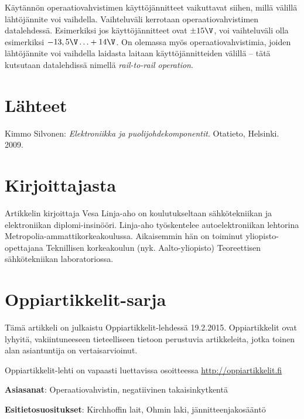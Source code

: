 \documentclass[twocolumn]{article}
\begin{document}
Käytännön operaatiovahvistimen käyttöjännitteet vaikuttavat siihen, millä välillä lähtöjännite voi vaihdella. Vaihteluväli kerrotaan operaatiovahvistimen datalehdessä. Esimerkiksi jos käyttöjännitteet ovat $\pm 15 \V$, voi vaihteluväli olla esimerkiksi  $-13,5\V \ldots +14 \V$. On olemassa myös operaatiovahvistimia, joiden lähtöjännite voi vaihdella laidasta laitaan käyttöjännitteiden välillä – tätä kutsutaan datalehdissä nimellä {\em rail-to-rail operation}.


\section{Lähteet}

Kimmo Silvonen: {\em Elektroniikka ja puolijohdekomponentit}. Otatieto, Helsinki. 2009.




\section*{Kirjoittajasta}

Artikkelin kirjoittaja Vesa Linja-aho on koulutukseltaan sähkötekniikan ja elektroniikan diplomi-insinööri. Linja-aho työskentelee autoelektroniikan lehtorina Metropolia-ammattikorkeakoulussa. Aikaisemmin hän on toiminut yliopisto-opettajana Teknillisen korkeakoulun (nyk. Aalto-yliopisto) Teoreettisen sähkötekniikan laboratoriossa.

\section*{Oppiartikkelit-sarja}

Tämä artikkeli on julkaistu Oppiartikkelit-lehdessä 19.2.2015. Oppiartikkelit ovat lyhyitä, vakiintuneeseen tieteelliseen tietoon perustuvia artikkeleita, jotka toinen alan asiantuntija on vertaisarvioinut.

Oppiartikkelit-lehti on vapaasti luettavissa osoitteessa \url{http://oppiartikkelit.fi}

{\bf Asiasanat}: Operaatiovahvistin, negatiivinen takaisinkytkentä

{\bf Esitietosuositukset}: Kirchhoffin lait, Ohmin laki, jännitteenjakosääntö
\end{document}
